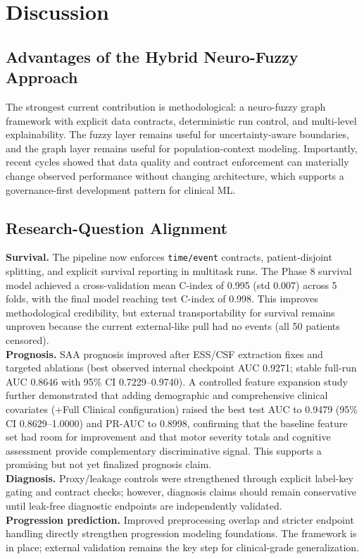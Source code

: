 \documentclass[journal,twoside,web]{ieeecolor}
\begin{document}
\section{Discussion}
\label{sec:discussion}

\subsection{Advantages of the Hybrid Neuro-Fuzzy Approach}
The strongest current contribution is methodological: a neuro-fuzzy graph framework with explicit data contracts, deterministic run control, and multi-level explainability. The fuzzy layer remains useful for uncertainty-aware boundaries, and the graph layer remains useful for population-context modeling. Importantly, recent cycles showed that data quality and contract enforcement can materially change observed performance without changing architecture, which supports a governance-first development pattern for clinical ML.

\subsection{Research-Question Alignment}
\textbf{Survival.} The pipeline now enforces \texttt{time/event} contracts, patient-disjoint splitting, and explicit survival reporting in multitask runs. The Phase 8 survival model achieved a cross-validation mean C-index of 0.995 (std 0.007) across 5 folds, with the final model reaching test C-index of 0.998. This improves methodological credibility, but external transportability for survival remains unproven because the current external-like pull had no events (all 50 patients censored).\\
\textbf{Prognosis.} SAA prognosis improved after ESS/CSF extraction fixes and targeted ablations (best observed internal checkpoint AUC 0.9271; stable full-run AUC 0.8646 with 95\% CI 0.7229--0.9740). A controlled feature expansion study further demonstrated that adding demographic and comprehensive clinical covariates (+Full Clinical configuration) raised the best test AUC to 0.9479 (95\% CI 0.8629--1.0000) and PR-AUC to 0.8998, confirming that the baseline feature set had room for improvement and that motor severity totals and cognitive assessment provide complementary discriminative signal. This supports a promising but not yet finalized prognosis claim.\\
\textbf{Diagnosis.} Proxy/leakage controls were strengthened through explicit label-key gating and contract checks; however, diagnosis claims should remain conservative until leak-free diagnostic endpoints are independently validated.\\
\textbf{Progression prediction.} Improved preprocessing overlap and stricter endpoint handling directly strengthen progression modeling foundations. The framework is in place; external validation remains the key step for clinical-grade generalization.
\end{document}
